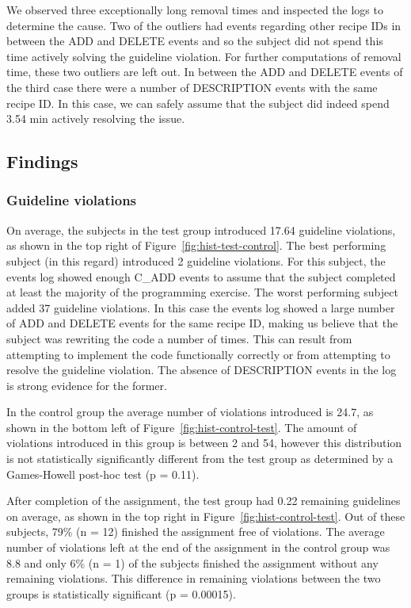 We observed three exceptionally long removal times and inspected the logs to determine the cause.
Two of the outliers had events regarding other recipe IDs in between the ADD and DELETE events and so the subject did not spend this time actively solving the guideline violation.
For further computations of removal time, these two outliers are left out.
In between the ADD and DELETE events of the third case there were a number of DESCRIPTION events with the same recipe ID. In this case, we can safely assume that the subject did indeed spend 3.54 min actively resolving the issue.

\subsection{Findings}
\subsubsection{Guideline violations}
On average, the subjects in the test group introduced 17.64 guideline violations, as shown in the top right of Figure~\ref{fig:hist-test-control}.
The best performing subject (in this regard) introduced 2 guideline violations.
For this subject, the events log showed enough C\_ADD events to assume that the subject completed at least the majority of the programming exercise.
The worst performing subject added 37 guideline violations.
In this case the events log showed a large number of ADD and DELETE events for the same recipe ID, making us believe that the subject was rewriting the code a number of times.
This can result from attempting to implement the code functionally correctly or from attempting to resolve the guideline violation.
The absence of DESCRIPTION events in the log is strong evidence for the former. 

In the control group the average number of violations introduced is 24.7, as shown in the bottom left of Figure~\ref{fig:hist-control-test}.
The amount of violations introduced in this group is between 2 and 54, however this distribution is not statistically significantly different from the test group as determined by a Games-Howell post-hoc test (p = 0.11).

After completion of the assignment, the test group had 0.22 remaining guidelines on average, as shown in the top right in Figure~\ref{fig:hist-control-test}.
Out of these subjects, 79\% (n = 12) finished the assignment free of violations.
The average number of violations left at the end of the assignment in the control group was 8.8 and only 6\% (n = 1) of the subjects finished the assignment without any remaining violations.
This difference in remaining violations between the two groups is statistically significant (p = 0.00015).

